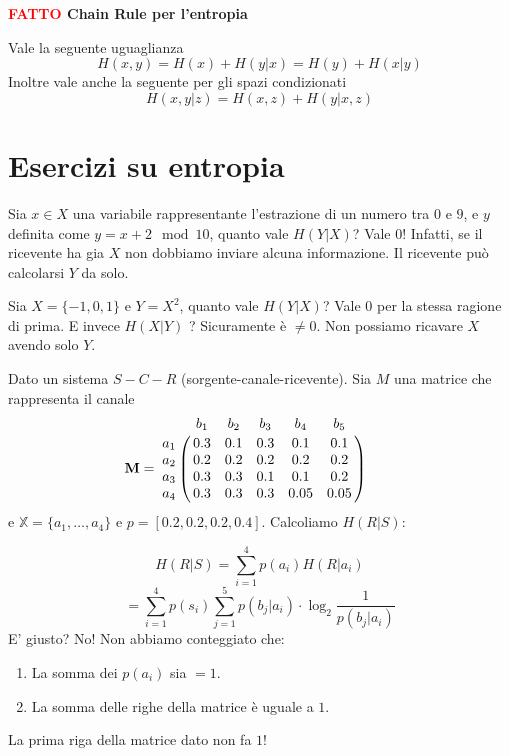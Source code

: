 \documentclass[12pt]{report}
\begin{document}
    \vspace{5px}
    \begin{tcolorbox}
        \textbf{\textcolor{red}{FATTO} Chain Rule per l'entropia}
        \vspace{5px}
        \begin{center}
            Vale la seguente uguaglianza
            $$H(x,y) = H(x) + H(y|x) = H(y) + H(x|y)$$
            Inoltre vale anche la seguente per gli spazi condizionati
            $$H(x,y|z) = H(x,z) + H(y|x,z)$$

        \end{center}
    \end{tcolorbox}

    \section{Esercizi su entropia}

    \begin{es}
        Sia $x \in X$ una variabile rappresentante l'estrazione di un numero tra $0$ e $9$, e $y$ definita come $y= x+2 \mod 10$, quanto vale $H(Y|X)$? Vale $0$! Infatti, se il ricevente ha gia $X$ non dobbiamo inviare alcuna informazione. Il ricevente può calcolarsi $Y$ da solo.
    \end{es}

    \begin{es}
        Sia $X = \{-1,0,1\}$ e $Y = X^2$, quanto vale $H(Y|X)$?  Vale $0$ per la stessa ragione di prima. E invece $H(X|Y)$ ? Sicuramente è $\neq 0 $. Non possiamo ricavare $X$ avendo solo $Y$.
    \end{es}

    \begin{es}
        Dato un sistema $S\!-\!C-\!R$ (sorgente-canale-ricevente). Sia $M$ una matrice che rappresenta il canale
        \[\mathbf{M} =
        \bordermatrix{ & b_1 & b_2 & b_3 & b_4 & b_5 \cr
        a_1 & 0.3 & 0.1 & 0.3 & 0.1 & 0.1 \cr
        a_2 & 0.2 & 0.2 & 0.2 & 0.2 & 0.2 \cr
        a_3 & 0.3 & 0.3 & 0.1 & 0.1 & 0.2  \cr
        a_4 & 0.3 & 0.3 & 0.3 & 0.05 & 0.05} \qquad
        \]
        e $\mathbb{X} = \{a_1,\dots,a_4\}$ e $p =[0.2, 0.2, 0.2, 0.4]$. Calcoliamo $H(R|S)$:

        $$H(R|S) = \sum_{i = 1}^4 p(a_i) H(R|a_i)$$
        $$= \sum_{i = 1}^4 p(s_i) \sum_{j = 1}^5 p(b_j|a_i) \cdot \log_2{\frac{1}{p(b_j|a_i)}}$$
        E' giusto? No! Non abbiamo conteggiato che:
        \begin{enumerate}
            \item La somma dei $p(a_i)$ sia $= 1$.
            \item La somma delle righe della matrice è uguale a $1$.
        \end{enumerate}
        La prima riga della matrice dato non fa $1$!
    \end{es}
\end{document}
